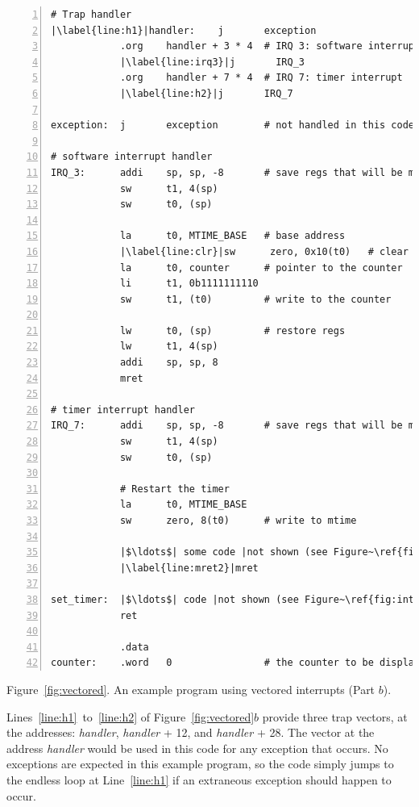 \documentclass[11pt, twoside, pdftex]{article}
\begin{document}
\begin{center}
\begin{minipage}[h]{15 cm}
\begin{lstlisting}[style=defaultNiosVStyle, name=vecs, numbers=left, escapechar=|]
# Trap handler
|\label{line:h1}|handler:    j       exception
            .org    handler + 3 * 4  # IRQ 3: software interrupt
            |\label{line:irq3}|j       IRQ_3
            .org    handler + 7 * 4  # IRQ 7: timer interrupt
            |\label{line:h2}|j       IRQ_7

exception:  j       exception        # not handled in this code
            
# software interrupt handler
IRQ_3:      addi    sp, sp, -8       # save regs that will be modified
            sw      t1, 4(sp)
            sw      t0, (sp)

            la      t0, MTIME_BASE   # base address
            |\label{line:clr}|sw      zero, 0x10(t0)   # clear software interrupt in msip
            la      t0, counter      # pointer to the counter
            li      t1, 0b1111111110
            sw      t1, (t0)         # write to the counter

            lw      t0, (sp)         # restore regs
            lw      t1, 4(sp)
            addi    sp, sp, 8
            mret

# timer interrupt handler
IRQ_7:      addi    sp, sp, -8       # save regs that will be modified
            sw      t1, 4(sp)
            sw      t0, (sp)
            
            # Restart the timer
            la      t0, MTIME_BASE
            sw      zero, 8(t0)      # write to mtime

            |$\ldots$| some code |not shown (see Figure~\ref{fig:ints})|
            |\label{line:mret2}|mret

set_timer:  |$\ldots$| code |not shown (see Figure~\ref{fig:ints})|
            ret

            .data
counter:    .word   0                # the counter to be displayed
\end{lstlisting}

\vspace{0.25in}
Figure~\ref{fig:vectored}.	An example program using vectored interrupts (Part $b$).
\end{minipage}
\end{center}

Lines~\ref{line:h1}~to~\ref{line:h2} of Figure~\ref{fig:vectored}$b$ provide three
trap vectors, at the addresses: {\it handler}, {\it handler} + 12, and {\it handler} + 28.
The vector at the address {\it handler} would be used in this code for any exception that
occurs. No exceptions are expected in this example program, so the code simply jumps to the
endless loop at Line~\ref{line:h1} if an extraneous exception should happen to occur. 
\end{document}
